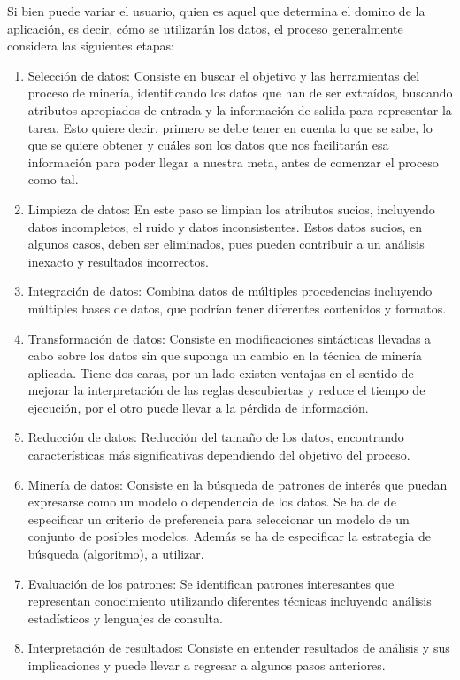 Si bien puede variar el usuario, quien es aquel que determina el domino de la aplicación, es decir, cómo se utilizarán los datos, el proceso generalmente considera las siguientes etapas:

\begin{enumerate}
\item Selección de datos: Consiste en buscar el objetivo y las herramientas del proceso de minería, identificando los datos que han de ser extraídos, buscando atributos apropiados de entrada y la información de salida para representar la tarea. Esto quiere decir, primero se debe tener en cuenta lo que se sabe, lo que se quiere obtener y cuáles son los datos que nos facilitarán esa información para poder llegar a nuestra meta, antes de comenzar el proceso como tal.
\item Limpieza de datos: En este paso se limpian los atributos sucios, incluyendo datos incompletos, el ruido y datos inconsistentes. Estos datos sucios, en algunos casos, deben ser eliminados, pues pueden contribuir a un análisis inexacto y resultados incorrectos.
\item Integración de datos: Combina datos de múltiples procedencias incluyendo múltiples bases de datos, que podrían tener diferentes contenidos y formatos.
\item Transformación de datos: Consiste en modificaciones sintácticas llevadas a cabo sobre los datos sin que suponga un cambio en la técnica de minería aplicada. Tiene dos caras, por un lado existen ventajas en el sentido de mejorar la interpretación de las reglas descubiertas y reduce el tiempo de ejecución, por el otro puede llevar a la pérdida de información.
\item Reducción de datos: Reducción del tamaño de los datos, encontrando características más significativas dependiendo del objetivo del proceso.
\item Minería de datos: Consiste en la búsqueda de patrones de interés que puedan expresarse como un modelo o dependencia de los datos. Se ha de de especificar un criterio de preferencia para seleccionar un modelo de un conjunto de posibles modelos. Además se ha de especificar la estrategia de búsqueda (algoritmo), a utilizar.
\item Evaluación de los patrones: Se identifican patrones interesantes que representan conocimiento utilizando diferentes técnicas incluyendo análisis estadísticos y lenguajes de consulta.
\item Interpretación de resultados: Consiste en entender resultados de análisis y sus implicaciones y puede llevar a regresar a algunos pasos anteriores.
\end{enumerate}

